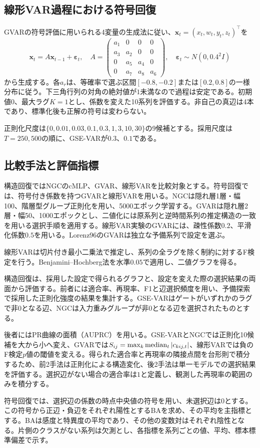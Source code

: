 \subsection{線形VAR過程における符号回復}
GVARの符号評価に用いられる4変量の生成法\citep{marcinkevics2021}に従い、\(\bm x_t=(x_t,w_t,y_t,z_t)^\top\)を
\begin{equation}
 \bm x_t=A\bm x_{t-1}+\bm\varepsilon_t,\quad
 A=\begin{pmatrix}
 a_1&0&0&0\\
 a_3&a_2&0&0\\
 0&a_5&a_4&0\\
 0&a_7&a_8&a_6
 \end{pmatrix},\quad
 \bm\varepsilon_t\sim N(0,0.4^2I)
 \label{eq:linear-generation}
\end{equation}
から生成する。各\(a_r\)は、等確率で選ぶ区間\([-0.8,-0.2]\)または\([0.2,0.8]\)の一様分布に従う。下三角行列の対角の絶対値が\(1\)未満なので過程は安定である。初期値\(0\)、最大ラグ\(K=1\)とし、係数を変えた10系列を評価する。非自己の真辺は4本であり、標準化後も正解の符号は変わらない。

正則化尺度は\(\{0,0.01,0.03,0.1,0.3,1,3,10,30\}\)の9候補とする。採用尺度は\(T=250,500\)の順に、GSE-VARが\(0.3\)、\(0.1\)である。

\subsection{比較手法と評価指標}
構造回復ではNGCのcMLP、GVAR、線形VARを比較対象とする。符号回復では、符号付き係数を持つGVARと線形VARを用いる。NGCは隠れ層1層・幅100、階層型グループ正則化を用い、5000エポック学習する。GVARは隠れ層2層・幅50、1000エポックとし、二値化には原系列と逆時間系列の推定構造の一致を用いる選択手順を適用する\citep{tank2022,marcinkevics2021}。線形VAR実験のGVARには、疎性係数\(0.2\)、平滑化係数\(0.5\)を用いる。Lorenz96のGVARは独立な予備系列で設定を選ぶ。

線形VARは切片付き最小二乗法で推定し、系列の全ラグを除く制約に対するF検定を行う。Benjamini--Hochberg法を水準\(0.05\)で適用し、二値グラフを得る\citep{benjamini1995}。

構造回復は、採用した設定で得られるグラフと、設定を変えた際の選択結果の両面から評価する。前者には適合率、再現率、F1と辺選択頻度を用い、予備探索で採用した正則化強度の結果を集計する。GSE-VARはゲートがいずれかのラグで非\(0\)となる辺、NGCは入力重みグループが非\(0\)となる辺を選択されたものとする。

後者にはPR曲線の面積（AUPRC）を用いる。GSE-VARとNGCでは正則化10候補を大から小へ変え、GVARでは\(S_{ij}=\max_k\operatorname{median}_t|c_{kij,t}|\)、線形VARでは負のF検定\(p\)値の閾値を変える。得られた適合率と再現率の隣接点間を台形則で積分するため、前2手法は正則化による構造変化、後2手法は単一モデルでの選択結果を評価する。選択辺がない場合の適合率は\(1\)と定義し、観測した再現率の範囲のみを積分する。

符号回復では、選択辺の係数の時点中央値の符号を用い、未選択辺は\(0\)とする。この符号から正辺・負辺をそれぞれ陽性とするBAを求め、その平均を主指標とする。BAは感度と特異度の平均であり、その他の変数対はそれぞれ陰性となる。片側のクラスがない系列は欠測とし、各指標を系列ごとの値、平均、標本標準偏差で示す。
